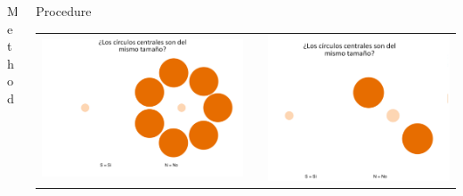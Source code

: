 \documentclass[final]{beamer}
\newlength{\onecolwid}
\newlength{\twocolwid}
\begin{document}
\begin{frame}[t]
\begin{columns}[t]
\begin{column}{\twocolwid}
\begin{columns}[t,totalwidth=\twocolwid]
\begin{column}{\onecolwid}
\begin{block}{Method}
\end{block}


\end{column} %

\begin{column}{\onecolwid}\vspace{-.6in} %


\begin{block}{Procedure}

\begin{center}
\begin{tabular}{ccc}
\includegraphics[width=0.55\linewidth]{Figures/MainTask.png} & \hfill & \includegraphics[width=0.5\linewidth]{Figures/MainTask2.png}
\end{tabular}
\end{center}




\end{block}
\end{column}
\end{columns}
\end{column}
\end{columns}
\end{frame}
\end{document}

